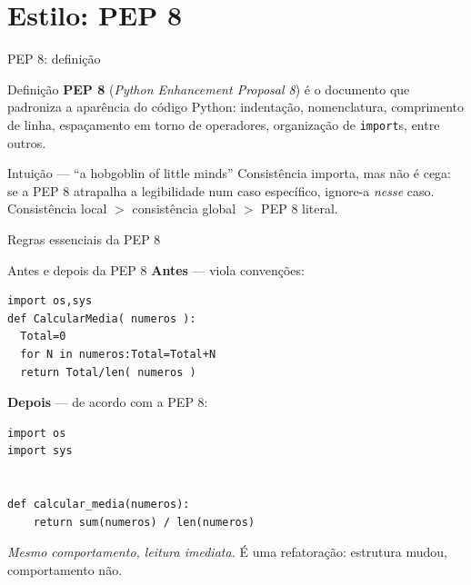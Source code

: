 \documentclass[aspectratio=169]{beamer}
\begin{document}
\section{Estilo: PEP 8}

\begin{frame}{PEP 8: definição}
  \begin{block}{Definição}
    \textbf{PEP 8} (\emph{Python Enhancement Proposal 8}) é o documento
    que padroniza a aparência do código Python: indentação,
    nomenclatura, comprimento de linha, espaçamento em torno de
    operadores, organização de \texttt{import}s, entre outros.
  \end{block}
  \begin{exampleblock}{Intuição --- ``a hobgoblin of little minds''}
    Consistência importa, mas não é cega: se a PEP 8 atrapalha
    a legibilidade num caso específico, ignore-a \emph{nesse} caso.
    Consistência local $>$ consistência global $>$ PEP 8 literal.
  \end{exampleblock}
\end{frame}

\begin{frame}{Regras essenciais da PEP 8}
  \begin{center}
  \end{center}
\end{frame}

\begin{frame}[fragile,shrink=5]{Antes e depois da PEP 8}
\textbf{Antes} --- viola convenções:
\begin{lstlisting}
import os,sys
def CalcularMedia( numeros ):
  Total=0
  for N in numeros:Total=Total+N
  return Total/len( numeros )
\end{lstlisting}
\textbf{Depois} --- de acordo com a PEP 8:
\begin{lstlisting}
import os
import sys


def calcular_media(numeros):
    return sum(numeros) / len(numeros)
\end{lstlisting}
\footnotesize\emph{Mesmo comportamento, leitura imediata.} É uma refatoração:
estrutura mudou, comportamento não.
\end{frame}
\end{document}

